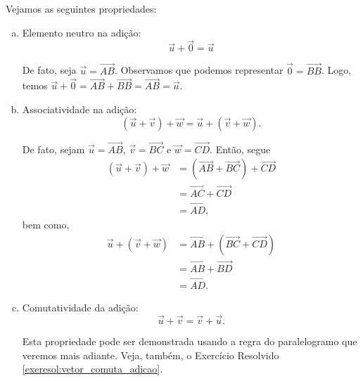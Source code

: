 \begin{obs}
  Vejamos as seguintes propriedades:
  \begin{enumerate}[a)]
  \item Elemento neutro na adição:
    \begin{equation}
      \vec{u} + \vec{0} = \vec{u}
    \end{equation}
    
    De fato, seja $\vec{u} = \overrightarrow{AB}$. Observamos que podemos representar $\vec{0} = \overrightarrow{BB}$. Logo, temos $\vec{u} + \vec{0} = \overrightarrow{AB} + \overrightarrow{BB} = \overrightarrow{AB} = \vec{u}$.

  \item Associatividade na adição:
    \begin{equation}
      (\vec{u} + \vec{v}) + \vec{w} = \vec{u} + (\vec{v} + \vec{w}).
    \end{equation}

    De fato, sejam $\vec{u} = \overrightarrow{AB}$, $\vec{v} = \overrightarrow{BC}$ e $\vec{w} = \overrightarrow{CD}$. Então, segue
    \begin{align}
      \left(\vec{u} + \vec{v}\right)+\vec{w} &= \left(\overrightarrow{AB}+\overrightarrow{BC}\right)+\overrightarrow{CD} \\
                                             &= \overrightarrow{AC} + \overrightarrow{CD} \\
                                             &= \overrightarrow{AD},
    \end{align}
    bem como,
    \begin{align}
      \vec{u} + \left(\vec{v} + \vec{w}\right) &= \overrightarrow{AB}+\left(\overrightarrow{BC}+\overrightarrow{CD}\right) \\
                                             &= \overrightarrow{AB} + \overrightarrow{BD} \\
                                             &= \overrightarrow{AD}.
    \end{align}
  \item Comutatividade da adição:
    \begin{equation}
      \vec{u} + \vec{v} = \vec{v} + \vec{u}.
    \end{equation}

    Esta propriedade pode ser demonstrada usando a regra do paralelogramo que veremos mais adiante. Veja, também, o Exercício Resolvido \ref{exeresol:vetor_comuta_adicao}.
  \end{enumerate}
\end{obs}

